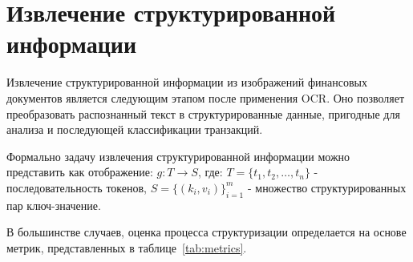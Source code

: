 \documentclass[14pt,a4paper]{extarticle}
\let\oldsection\section
\renewcommand{\section}{\clearpage\oldsection}
\begin{document}
\section{Извлечение структурированной информации}

Извлечение структурированной информации из изображений финансовых документов является следующим этапом после применения OCR. Оно позволяет преобразовать распознанный текст в структурированные данные, пригодные для анализа и последующей классификации транзакций.

Формально задачу извлечения структурированной информации
можно представить как отображение: $g : T \rightarrow S$, где: $T=\{t_1,t_2,\dots,t_n\}$ - последовательность токенов, $S=\{(k_i,v_i)\}_{i=1}^{m}$ - множество структурированных пар
ключ-значение.

В большинстве случаев, оценка процесса структуризации определается на основе метрик, представленных в таблице~\ref{tab:metrics}.
\end{document}
